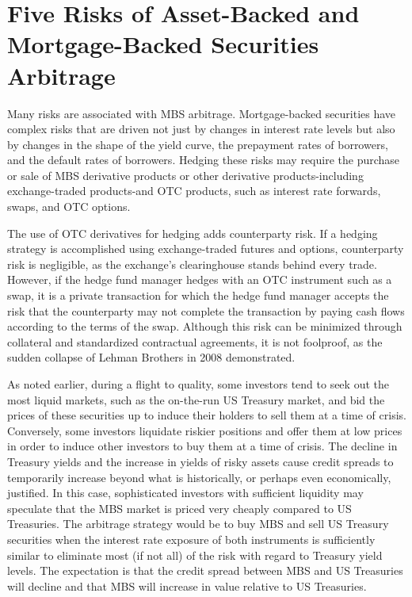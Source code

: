 \documentclass[11pt]{article}
\begin{document}
\section*{Five Risks of Asset-Backed and Mortgage-Backed Securities Arbitrage}
Many risks are associated with MBS arbitrage. Mortgage-backed securities have complex risks that are driven not just by changes in interest rate levels but also by changes in the shape of the yield curve, the prepayment rates of borrowers, and the default rates of borrowers. Hedging these risks may require the purchase or sale of MBS derivative products or other derivative products-including exchange-traded products-and OTC products, such as interest rate forwards, swaps, and OTC options.

The use of OTC derivatives for hedging adds counterparty risk. If a hedging strategy is accomplished using exchange-traded futures and options, counterparty risk is negligible, as the exchange's clearinghouse stands behind every trade. However, if the hedge fund manager hedges with an OTC instrument such as a swap, it is a private transaction for which the hedge fund manager accepts the risk that the counterparty may not complete the transaction by paying cash flows according to the terms of the swap. Although this risk can be minimized through collateral and standardized contractual agreements, it is not foolproof, as the sudden collapse of Lehman Brothers in 2008 demonstrated.

As noted earlier, during a flight to quality, some investors tend to seek out the most liquid markets, such as the on-the-run US Treasury market, and bid the prices of these securities up to induce their holders to sell them at a time of crisis. Conversely, some investors liquidate riskier positions and offer them at low prices in order to induce other investors to buy them at a time of crisis. The decline in Treasury yields and the increase in yields of risky assets cause credit spreads to temporarily increase beyond what is historically, or perhaps even economically, justified. In this case, sophisticated investors with sufficient liquidity may speculate that the MBS market is priced very cheaply compared to US Treasuries. The arbitrage strategy would be to buy MBS and sell US Treasury securities when the interest rate exposure of both instruments is sufficiently similar to eliminate most (if not all) of the risk with regard to Treasury yield levels. The expectation is that the credit spread between MBS and US Treasuries will decline and that MBS will increase in value relative to US Treasuries.
\end{document}
